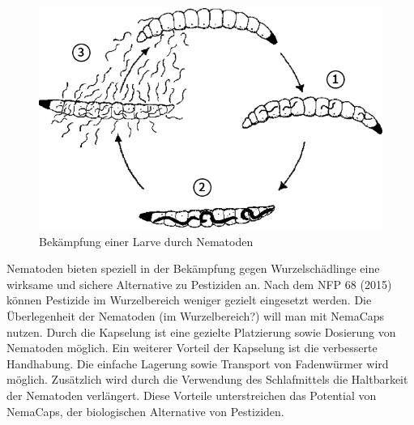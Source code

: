 \begin{figure}
	\includegraphics[scale=0.4]{Illustrationen/3-Einleitung/zyklus_nematoden.png}
\caption{Bekämpfung einer Larve durch Nematoden}
\label{fig:zyklus_Nematoden}
\end{figure}

	
Nematoden bieten speziell in der Bekämpfung gegen Wurzelschädlinge eine wirksame und sichere Alternative zu Pestiziden an. Nach dem NFP 68 (2015) können Pestizide im Wurzelbereich weniger gezielt eingesetzt werden. Die Überlegenheit der Nematoden (im Wurzelbereich?) will man mit NemaCaps nutzen. Durch die Kapselung ist eine gezielte Platzierung sowie Dosierung von Nematoden möglich. Ein weiterer Vorteil der Kapselung ist die verbesserte Handhabung. Die einfache Lagerung sowie Transport von Fadenwürmer wird möglich.  Zusätzlich wird durch die Verwendung des Schlafmittels die Haltbarkeit der Nematoden verlängert. Diese Vorteile unterstreichen das Potential von NemaCaps, der biologischen Alternative von Pestiziden.
